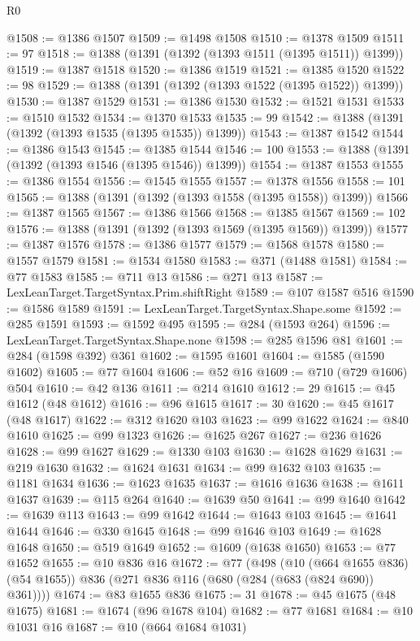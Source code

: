 \begin{lexlean}{R0}
\begin{coremodule}
@1508 := @1386 @1507
@1509 := @1498 @1508
@1510 := @1378 @1509
@1511 := 97
@1518 := @1388 (@1391 (@1392 (@1393 @1511 (@1395 @1511)) @1399))
@1519 := @1387 @1518
@1520 := @1386 @1519
@1521 := @1385 @1520
@1522 := 98
@1529 := @1388 (@1391 (@1392 (@1393 @1522 (@1395 @1522)) @1399))
@1530 := @1387 @1529
@1531 := @1386 @1530
@1532 := @1521 @1531
@1533 := @1510 @1532
@1534 := @1370 @1533
@1535 := 99
@1542 := @1388 (@1391 (@1392 (@1393 @1535 (@1395 @1535)) @1399))
@1543 := @1387 @1542
@1544 := @1386 @1543
@1545 := @1385 @1544
@1546 := 100
@1553 := @1388 (@1391 (@1392 (@1393 @1546 (@1395 @1546)) @1399))
@1554 := @1387 @1553
@1555 := @1386 @1554
@1556 := @1545 @1555
@1557 := @1378 @1556
@1558 := 101
@1565 := @1388 (@1391 (@1392 (@1393 @1558 (@1395 @1558)) @1399))
@1566 := @1387 @1565
@1567 := @1386 @1566
@1568 := @1385 @1567
@1569 := 102
@1576 := @1388 (@1391 (@1392 (@1393 @1569 (@1395 @1569)) @1399))
@1577 := @1387 @1576
@1578 := @1386 @1577
@1579 := @1568 @1578
@1580 := @1557 @1579
@1581 := @1534 @1580
@1583 := @371 (@1488 @1581)
@1584 := @77 @1583
@1585 := @711 @13
@1586 := @271 @13
@1587 := LexLeanTarget.TargetSyntax.Prim.shiftRight
@1589 := @107 @1587 @516
@1590 := @1586 @1589
@1591 := LexLeanTarget.TargetSyntax.Shape.some
@1592 := @285 @1591
@1593 := @1592 @495
@1595 := @284 (@1593 @264)
@1596 := LexLeanTarget.TargetSyntax.Shape.none
@1598 := @285 @1596 @81
@1601 := @284 (@1598 @392) @361
@1602 := @1595 @1601
@1604 := @1585 (@1590 @1602)
@1605 := @77 @1604
@1606 := @52 @16
@1609 := @710 (@729 @1606) @504
@1610 := @42 @136
@1611 := @214 @1610
@1612 := 29
@1615 := @45 @1612 (@48 @1612)
@1616 := @96 @1615
@1617 := 30
@1620 := @45 @1617 (@48 @1617)
@1622 := @312 @1620 @103
@1623 := @99 @1622
@1624 := @840 @1610
@1625 := @99 @1323
@1626 := @1625 @267
@1627 := @236 @1626
@1628 := @99 @1627
@1629 := @1330 @103
@1630 := @1628 @1629
@1631 := @219 @1630
@1632 := @1624 @1631
@1634 := @99 @1632 @103
@1635 := @1181 @1634
@1636 := @1623 @1635
@1637 := @1616 @1636
@1638 := @1611 @1637
@1639 := @115 @264
@1640 := @1639 @50
@1641 := @99 @1640
@1642 := @1639 @113
@1643 := @99 @1642
@1644 := @1643 @103
@1645 := @1641 @1644
@1646 := @330 @1645
@1648 := @99 @1646 @103
@1649 := @1628 @1648
@1650 := @519 @1649
@1652 := @1609 (@1638 @1650)
@1653 := @77 @1652
@1655 := @10 @836 @16
@1672 := @77
    (@498
      (@10 (@664 @1655 @836) (@54 @1655))
      @836
      (@271 @836 @116 (@680 (@284 (@683 (@824 @690)) @361))))
@1674 := @83 @1655 @836
@1675 := 31
@1678 := @45 @1675 (@48 @1675)
@1681 := @1674 (@96 @1678 @104)
@1682 := @77 @1681
@1684 := @10 @1031 @16
@1687 := @10 (@664 @1684 @1031)

\end{coremodule}
\end{lexlean}
